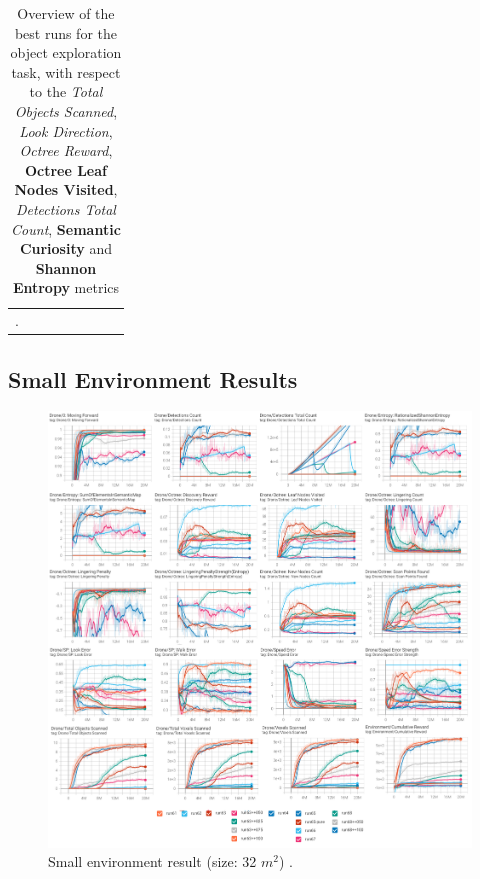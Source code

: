 \begin{table}
\begin{longtable}{|l|c|c|c|c|c|c|c|}
    \caption{Overview of the best runs for the object exploration task, with respect to the \textit{Total Objects Scanned}, \textit{Look Direction}, \textit{Octree Reward}, \textbf{Octree Leaf Nodes Visited}, \textit{Detections Total Count}, \textbf{Semantic Curiosity} and \textbf{Shannon Entropy} metrics}. \label{tab:results-mixed-agents}
\end{longtable}


\end{table}

\newpage





\subsection{Small Environment Results}
\begin{figure}[!ht]
        \centering
        \includegraphics[width=1\textwidth]{images/results_baseAgent.png}
        \caption{Small environment result (size: 32 $m^2$) .
        }
        \label{fig:results-small-env-performances}
\end{figure}


